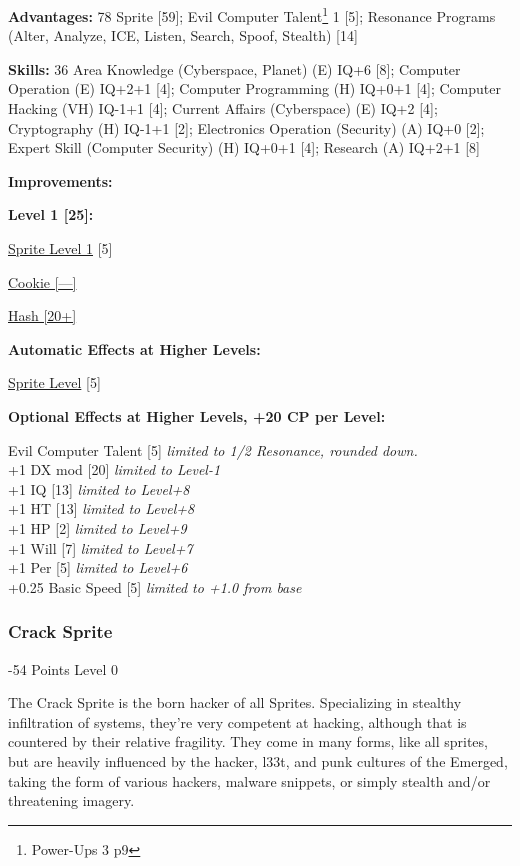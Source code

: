 \begin{multicols*}{3}
\textbf{Advantages:} 78
Sprite [59]; Evil Computer Talent\footnote{Power-Ups 3 p9} 1 [5]; Resonance Programs (Alter, Analyze, ICE, Listen, Search, Spoof, Stealth) [14]

\textbf{Skills:} 36
Area Knowledge (Cyberspace, Planet) (E) IQ+6 [8]; Computer Operation (E) IQ+2+1 [4]; Computer Programming (H) IQ+0+1 [4]; Computer Hacking (VH) IQ-1+1 [4]; Current Affairs (Cyberspace) (E) IQ+2 [4]; Cryptography (H) IQ-1+1 [2]; Electronics Operation (Security) (A) IQ+0 [2]; Expert Skill (Computer Security) (H) IQ+0+1 [4]; Research (A) IQ+2+1 [8]

\textbf{ Improvements:}

\textbf{Level 1 [25]:}

\hyperref[sprite_level]{Sprite Level 1} [5]

\hyperref[cookie]{Cookie [—]}

\hyperref[hash]{Hash [20+]}

\textbf{Automatic Effects at Higher Levels:}

\hyperref[sprite_level]{Sprite Level} [5]

\textbf{Optional Effects at Higher Levels, +20 CP per Level:}

Evil Computer Talent [5] \textit{limited to 1/2 Resonance, rounded down.}\\
+1 DX mod [20] \textit{limited to Level-1}\\
+1 IQ [13] \textit{limited to Level+8}\\
+1 HT [13] \textit{limited to Level+8}\\
+1 HP [2] \textit{limited to Level+9}\\
+1 Will [7] \textit{limited to Level+7}\\
+1 Per [5] \textit{limited to Level+6}\\
+0.25 Basic Speed [5] \textit{limited to +1.0 from base}\\

\subsubsection{Crack Sprite}
\begin{flushright}
	-54 Points Level 0
\end{flushright}

The Crack Sprite is the born hacker of all Sprites. Specializing in stealthy infiltration of systems, they're very competent at hacking, although that is countered by their relative fragility. They come in many forms, like all sprites, but are heavily influenced by the hacker, l33t, and punk cultures of the Emerged, taking the form of various hackers, malware snippets, or simply stealth and/or threatening imagery.


\end{multicols*}
